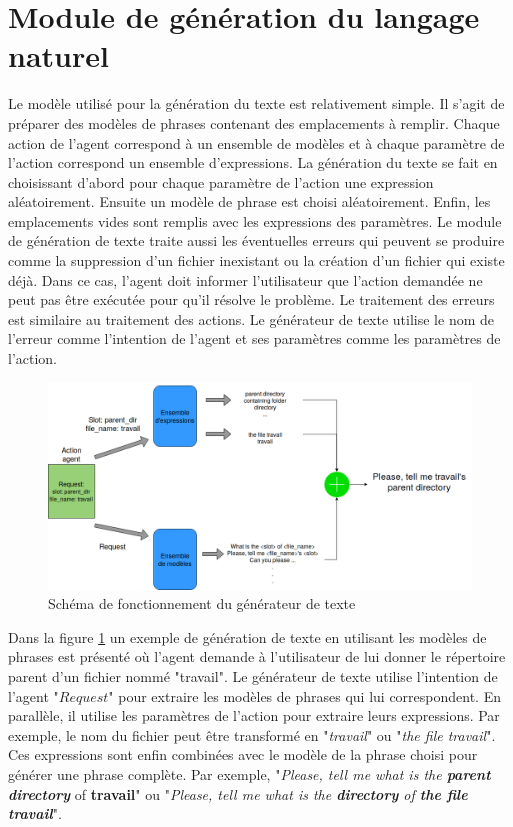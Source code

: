 \section{Module de génération du langage naturel}
Le modèle utilisé pour la génération du texte est relativement simple. Il s'agit de préparer des modèles de phrases contenant des emplacements à remplir. Chaque action de l'agent correspond à un ensemble de modèles et à chaque paramètre de l'action correspond un ensemble d'expressions. La génération du texte se fait en choisissant d'abord pour chaque paramètre de l'action une expression aléatoirement. Ensuite un modèle de phrase est choisi aléatoirement. Enfin, les emplacements vides sont remplis avec les expressions des paramètres. Le module de génération de texte traite aussi les éventuelles erreurs qui peuvent se produire comme la suppression d'un fichier inexistant ou la création d'un fichier qui existe déjà. Dans ce cas, l'agent doit informer l'utilisateur que l'action demandée ne peut pas être exécutée pour qu'il résolve le problème. Le traitement des erreurs est similaire au traitement des actions. Le générateur de texte utilise le nom de l'erreur comme l'intention de l'agent et ses paramètres comme les paramètres de l'action.
\begin{figure}[H] 
	\centering
	\includegraphics[width=0.95\linewidth]{images/Conception/NLG.png}
	\caption{Schéma de fonctionnement du générateur de texte}\label{nlg_schema}
\end{figure}
Dans la figure \ref{nlg_schema} un exemple de génération de texte en utilisant les modèles de phrases est présenté où l'agent demande à l'utilisateur de lui donner le répertoire parent d'un fichier nommé "travail". Le générateur de texte utilise l'intention de l'agent "$Request$" pour extraire les modèles de phrases qui lui correspondent. En parallèle, il utilise les paramètres de l'action pour extraire leurs expressions. Par exemple, le nom du fichier peut être transformé en "\textit{travail}" ou "\textit{the file travail}". Ces expressions sont enfin combinées avec le modèle de la phrase choisi pour générer une phrase complète. Par exemple, "\textit{Please, tell me what is the \textbf{parent directory}} of \textbf{travail}" ou "\textit{Please, tell me what is the \textbf{directory} of \textbf{the file travail}}".
